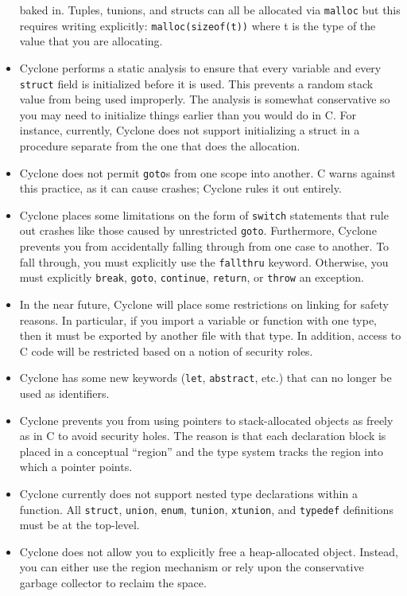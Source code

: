 \begin{itemize}
  baked in. Tuples, tunions, and structs can all be allocated via
  \texttt{malloc} but this requires writing explicitly:
  \texttt{malloc(sizeof(t))} where t is the type of the value that you
  are allocating.
\item Cyclone performs a static analysis to ensure that every variable
  and every \texttt{struct} field is initialized before it is used. This
  prevents a random stack value from being used improperly. The
  analysis is somewhat conservative so you may need to initialize
  things earlier than you would do in C\@. For instance, currently,
  Cyclone does not support initializing a struct in a procedure
  separate from the one that does the allocation.
\item Cyclone does not permit \texttt{goto}s from one scope into
  another. C warns against this practice, as it can cause crashes;
  Cyclone rules it out entirely.
\item Cyclone places some limitations on the form of \texttt{switch}
  statements that rule out crashes like those caused by unrestricted
  \texttt{goto}.  Furthermore, Cyclone prevents you from accidentally
  falling through from one case to another. To fall through, you must
  explicitly use the \texttt{fallthru} keyword.  Otherwise, you must
  explicitly \texttt{break}, \texttt{goto}, \texttt{continue},
  \texttt{return}, or \texttt{throw} an exception.
\item In the near future, Cyclone will place some restrictions on
  linking for safety reasons. In particular, if you import a variable
  or function with one type, then it must be exported by another file
  with that type. In addition, access to C code will be restricted
  based on a notion of security roles.
\item Cyclone has some new keywords (\texttt{let}, \texttt{abstract},
  etc.) that can no longer be used as identifiers.
\item Cyclone prevents you from using pointers to stack-allocated
  objects as freely as in C to avoid security holes. The reason is
  that each declaration block is placed in a conceptual ``region'' and
  the type system tracks the region into which a pointer points.
\item Cyclone currently does not support nested type declarations
  within a function. All \texttt{struct}, \texttt{union}, \texttt{enum},
  \texttt{tunion}, \texttt{xtunion}, and \texttt{typedef} definitions must
  be at the top-level.
\item Cyclone does not allow you to explicitly free a heap-allocated
  object. Instead, you can either use the region mechanism or rely
  upon the conservative garbage collector to reclaim the space.
\end{itemize}

